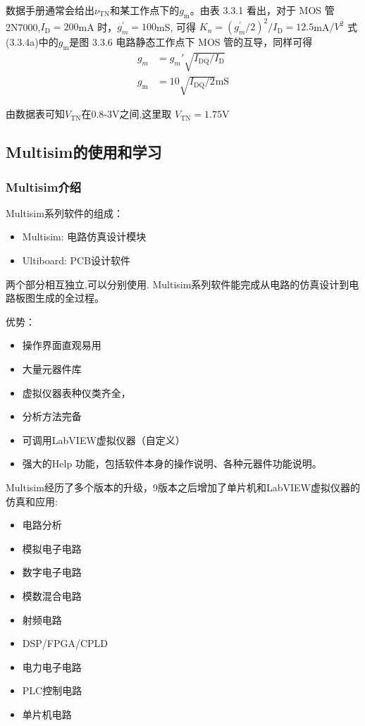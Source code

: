 \documentclass[a4paper,11pt,UTF8]{article}
\numberwithin{equation}{subsection}
\begin{document}
数据手册通常会给出$\nu_\mathrm{TN}$和某工作点下的$g_\mathrm{m}$。由表 3.3.1 看出，对于 MOS 管 2N7000,$I_{\mathrm{D} }= 200$mA 时，$g_m^{\prime}= 100$mS, 可得 $K_n= ( g_m^{\prime}/2) ^2/I_{\mathrm{D} }= 12.5$mA$/V^2$ 式(3.3.4a)中的$g_\mathrm{m}$是图 3.3.6 电路静态工作点下 MOS 管的互导，同样可得
\begin{align}
	g_m&=g_m'\sqrt{I_{\mathrm{DQ}}/I_{\mathrm{D}}}\\
	g_{\mathrm{m}}&=10\sqrt{I_{\mathrm{DQ}}/2}\mathrm{mS}
\end{align}

由数据表可知$V_{\mathrm{TN}}$在0.8-3V之间,这里取 $V_{\mathrm{TN}}=1.75\mathrm{V}$
\subsection{Multisim的使用和学习}
\subsubsection{Multisim介绍}
\noindent Multisim系列软件的组成：
\begin{itemize}
	\item Multisim: 电路仿真设计模块
	\item Ultiboard: PCB设计软件
\end{itemize}

两个部分相互独立,可以分别使用. Multisim系列软件能完成从电路的仿真设计到电路板图生成的全过程。

\noindent 优势：
\begin{itemize}
	\item 操作界面直观易用
	\item 大量元器件库
	\item 虚拟仪器表种仪类齐全，
	\item 分析方法完备
	\item 可调用LabVIEW虚拟仪器（自定义）
	\item 强大的Help 功能，包括软件本身的操作说明、各种元器件功能说明。
\end{itemize}

Multisim经历了多个版本的升级，9版本之后增加了单片机和LabVIEW虚拟仪器的仿真和应用:
\begin{itemize}
	\item 电路分析
	\item 模拟电子电路
	\item 数字电子电路
	\item 模数混合电路
	\item 射频电路
	\item DSP/FPGA/CPLD
	\item 电力电子电路
	\item PLC控制电路
	\item 单片机电路
\end{itemize}
\end{document}
